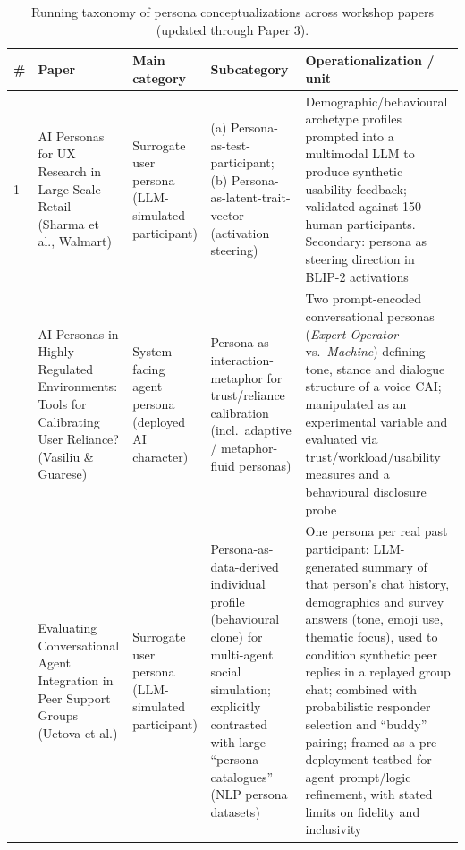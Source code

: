 \begin{table}[t]
\centering
\caption{Running taxonomy of persona conceptualizations across workshop papers (updated through Paper 3).}
\label{tab:persona-taxonomy}
\small
\begin{tabular}{p{0.5cm} p{3.6cm} p{3.4cm} p{3.6cm} p{3.6cm}}
\toprule
\textbf{\#} & \textbf{Paper} & \textbf{Main category} & \textbf{Subcategory} & \textbf{Operationalization / unit} \\
\midrule
1 & AI Personas for UX Research in Large Scale Retail (Sharma et al., Walmart) &
Surrogate user persona (LLM-simulated participant) &
(a) Persona-as-test-participant; (b) Persona-as-latent-trait-vector (activation steering) &
Demographic/behavioural archetype profiles prompted into a multimodal LLM to produce synthetic usability feedback; validated against 150 human participants. Secondary: persona as steering direction in BLIP-2 activations \\
\addlinespace
2 & AI Personas in Highly Regulated Environments: Tools for Calibrating User Reliance? (Vasiliu \& Guarese) &
System-facing agent persona (deployed AI character) &
Persona-as-interaction-metaphor for trust/reliance calibration (incl.\ adaptive / metaphor-fluid personas) &
Two prompt-encoded conversational personas (\textit{Expert Operator} vs.\ \textit{Machine}) defining tone, stance and dialogue structure of a voice CAI; manipulated as an experimental variable and evaluated via trust/workload/usability measures and a behavioural disclosure probe \\
\addlinespace
3 & Evaluating Conversational Agent Integration in Peer Support Groups (Uetova et al.) &
Surrogate user persona (LLM-simulated participant) &
Persona-as-data-derived individual profile (behavioural clone) for multi-agent social simulation; explicitly contrasted with large ``persona catalogues'' (NLP persona datasets) &
One persona per real past participant: LLM-generated summary of that person's chat history, demographics and survey answers (tone, emoji use, thematic focus), used to condition synthetic peer replies in a replayed group chat; combined with probabilistic responder selection and ``buddy'' pairing; framed as a pre-deployment testbed for agent prompt/logic refinement, with stated limits on fidelity and inclusivity \\
\bottomrule
\end{tabular}
\end{table}
